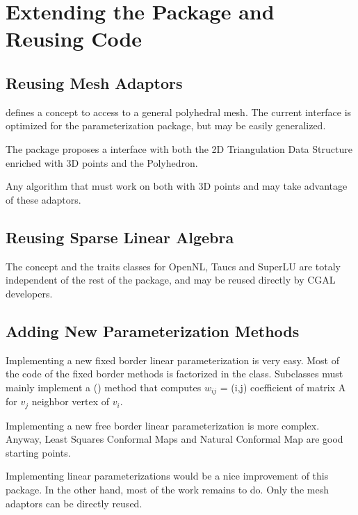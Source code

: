 \section{Extending the Package and Reusing Code}

\subsection{Reusing Mesh Adaptors}

 defines a concept to access to a general polyhedral mesh.
The current interface is optimized for the parameterization package,
but may be easily generalized.

The package proposes
a  interface with both the 2D Triangulation Data Structure enriched
with 3D points and the Polyhedron.

Any algorithm that must work on both  with 3D points
and  may take advantage of these adaptors.


\subsection{Reusing Sparse Linear Algebra}

The  concept and the traits classes for OpenNL,
{\sc Taucs} and SuperLU are totaly independent of the rest of the package,
and may be reused directly by CGAL developers.


\subsection{Adding New Parameterization Methods}

Implementing a new fixed border linear parameterization is very easy.
Most of the code of the fixed border methods
is factorized in the  class.
Subclasses must mainly implement a () method
that computes $w_{ij}$ = (i,j) coefficient of matrix A for $v_j$ neighbor vertex of $v_i$.

Implementing a new free border linear parameterization is more complex.
Anyway, Least Squares Conformal Maps and Natural Conformal Map
are good starting points.

Implementing  linear parameterizations would be a nice improvement
of this package. In the other hand, most of the work remains to do.
Only the mesh adaptors can be directly reused.


